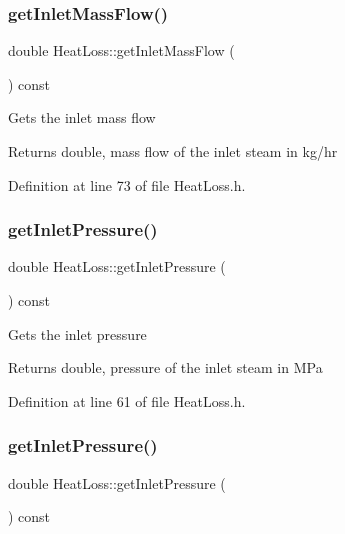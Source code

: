 \subsubsection{\texorpdfstring{get\+Inlet\+Mass\+Flow()}{getInletMassFlow()}\hspace{0.1cm}{\footnotesize\ttfamily [3/3]}}
{\footnotesize\ttfamily double Heat\+Loss\+::get\+Inlet\+Mass\+Flow (\begin{DoxyParamCaption}{ }\end{DoxyParamCaption}) const\hspace{0.3cm}{\ttfamily [inline]}}

Gets the inlet mass flow \begin{DoxyReturn}{Returns}
double, mass flow of the inlet steam in kg/hr 
\end{DoxyReturn}


Definition at line 73 of file Heat\+Loss.\+h.

\mbox{\label{class_heat_loss_a09e6e05477fd6794ea7f42bb43da2f50}} 
\subsubsection{\texorpdfstring{get\+Inlet\+Pressure()}{getInletPressure()}\hspace{0.1cm}{\footnotesize\ttfamily [1/3]}}
{\footnotesize\ttfamily double Heat\+Loss\+::get\+Inlet\+Pressure (\begin{DoxyParamCaption}{ }\end{DoxyParamCaption}) const\hspace{0.3cm}{\ttfamily [inline]}}

Gets the inlet pressure \begin{DoxyReturn}{Returns}
double, pressure of the inlet steam in M\+Pa 
\end{DoxyReturn}


Definition at line 61 of file Heat\+Loss.\+h.

\mbox{\label{class_heat_loss_a09e6e05477fd6794ea7f42bb43da2f50}} 
\subsubsection{\texorpdfstring{get\+Inlet\+Pressure()}{getInletPressure()}\hspace{0.1cm}{\footnotesize\ttfamily [2/3]}}
{\footnotesize\ttfamily double Heat\+Loss\+::get\+Inlet\+Pressure (\begin{DoxyParamCaption}{ }\end{DoxyParamCaption}) const\hspace{0.3cm}{\ttfamily [inline]}}

